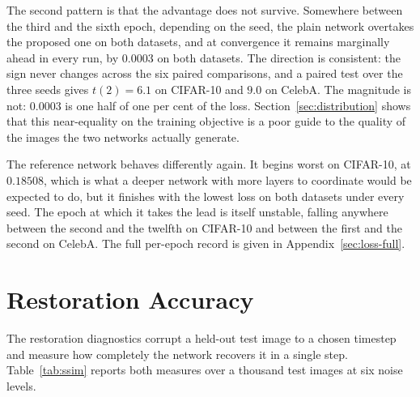 The second pattern is that the advantage does not survive. Somewhere between the third and the sixth
epoch, depending on the seed, the plain network overtakes the proposed one on both datasets, and at
convergence it remains marginally ahead in every run, by $0.0003$ on both datasets. The direction is
consistent: the sign never changes across the six paired comparisons, and a paired test over the
three seeds gives $t(2) = 6.1$ on CIFAR-10 and $9.0$ on CelebA. The magnitude is not: $0.0003$ is
one half of one per cent of the loss. Section~\ref{sec:distribution} shows that this near-equality
on the training objective is a poor guide to the quality of the images the two networks actually
generate.

The reference network behaves differently again. It begins worst on CIFAR-10, at $0.18508$, which is
what a deeper network with more layers to coordinate would be expected to do, but it finishes with
the lowest loss on both datasets under every seed. The epoch at which it takes the lead is itself
unstable, falling anywhere between the second and the twelfth on CIFAR-10 and between the first and
the second on CelebA. The full per-epoch record is given in Appendix~\ref{sec:loss-full}.

\section{Restoration Accuracy}

The restoration diagnostics corrupt a held-out test image to a chosen timestep and measure how
completely the network recovers it in a single step. Table~\ref{tab:ssim} reports both measures over
a thousand test images at six noise levels.


